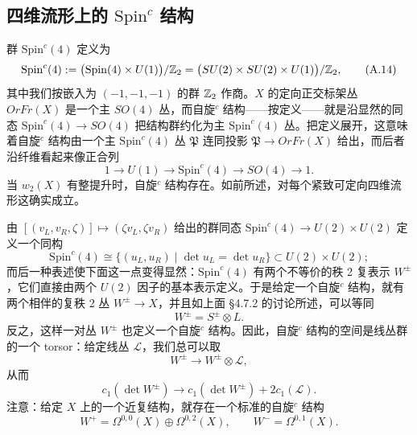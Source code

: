 \subsection{四维流形上的 $\mathrm{Spin}^{c}$ 结构}

群 $\mathrm{Spin}^{c}(4)$ 定义为
\begin{equation}
\mathrm{Spin}^{c}(4):=\bigl(\mathrm{Spin}(4)\times U(1)\bigr)/\mathbb{Z}_{2}
=\bigl(SU(2)\times SU(2)\times U(1)\bigr)/\mathbb{Z}_{2},
\tag{A.14}
\end{equation}
其中我们按嵌入为 $(-1,-1,-1)$ 的群 $\mathbb{Z}_{2}$ 作商。$X$ 的定向正交标架丛 $OrFr(X)$ 是一个主 $SO(4)$ 丛，而自旋$^{c}$ 结构——按定义——就是沿显然的同态 $\mathrm{Spin}^{c}(4)\to SO(4)$ 把结构群约化为主 $\mathrm{Spin}^{c}(4)$ 丛。把定义展开，这意味着自旋$^{c}$ 结构由一个主 $\mathrm{Spin}^{c}(4)$ 丛 $\mathfrak{P}$ 连同投影 $\mathfrak{P}\to OrFr(X)$ 给出，而后者沿纤维看起来像正合列
\begin{equation}
1\to U(1)\to\mathrm{Spin}^{c}(4)\to SO(4)\to1.
\tag{A.15}
\end{equation}
当 $w_{2}(X)$ 有整提升时，自旋$^{c}$ 结构存在。如前所述，对每个紧致可定向四维流形这确实成立。

由 $[(v_{L},v_{R},\zeta)]\mapsto(\zeta v_{L},\zeta v_{R})$ 给出的群同态 $\mathrm{Spin}^{c}(4)\to U(2)\times U(2)$ 定义一个同构
\begin{equation}
\mathrm{Spin}^{c}(4)\cong\bigl\{(u_{L},u_{R})\;\big|\;\det u_{L}=\det u_{R}\bigr\}
\subset U(2)\times U(2);
\tag{A.16}
\end{equation}
而后一种表述使下面这一点变得显然：$\mathrm{Spin}^{c}(4)$ 有两个不等价的秩 2 复表示 $W^{\pm}$，它们直接由两个 $U(2)$ 因子的基本表示定义。于是给定一个自旋$^{c}$ 结构，就有两个相伴的复秩 2 丛 $W^{\pm}\to X$，并且如上面 §4.7.2 的讨论所述，可以等同
\begin{equation}
W^{\pm}=S^{\pm}\otimes L.
\tag{A.17}
\end{equation}
反之，这样一对丛 $W^{\pm}$ 也定义一个自旋$^{c}$ 结构。因此，自旋$^{c}$ 结构的空间是线丛群的一个 torsor：给定线丛 $\mathcal{L}$，我们总可以取
\begin{equation}
W^{\pm}\to W^{\pm}\otimes\mathcal{L},
\tag{A.18}
\end{equation}
从而
\begin{equation}
c_{1}(\det W^{\pm})\to c_{1}(\det W^{\pm})+2c_{1}(\mathcal{L}).
\tag{A.19}
\end{equation}
注意：给定 $X$ 上的一个近复结构，就存在一个标准的自旋$^{c}$ 结构
\begin{equation}
W^{+}=\Omega^{0,0}(X)\oplus\Omega^{0,2}(X),
\qquad
W^{-}=\Omega^{0,1}(X).
\tag{A.20}
\end{equation}

